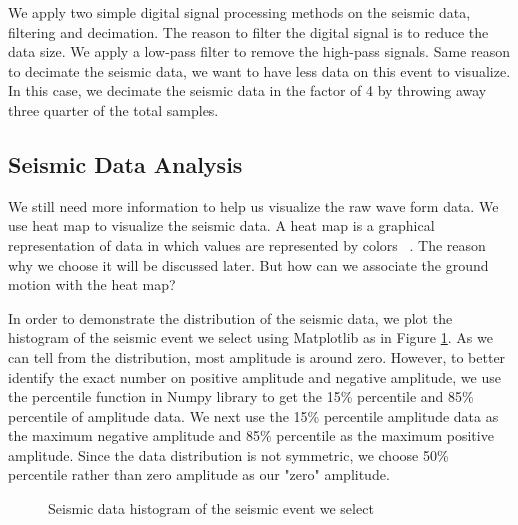 \documentclass[9pt,twocolumn,twoside]{../../styles/osajnl}
\begin{document}
We apply two simple digital signal processing methods on the seismic data, filtering and decimation. The reason to filter the digital signal is to reduce the data size. We apply a low-pass filter to remove the high-pass signals. Same reason to decimate the seismic data, we want to have less data on this event to visualize. In this case, we decimate the seismic data in the factor of 4 by throwing away three quarter of the total samples.

\subsection{Seismic Data Analysis}

We still need more information to help us visualize the raw wave form data. We use heat map to visualize the seismic data. A heat map is a graphical representation of data in which values are represented by colors ~\cite{www-heatmap}. The reason why we choose it will be discussed later. But how can we associate the ground motion with the heat map?

In order to demonstrate the distribution of the seismic data, we plot the histogram of the seismic event we select using Matplotlib as in Figure \ref{fig:percentile}. As we can tell from the distribution, most amplitude is around zero. However, to better identify the exact number on positive amplitude and negative amplitude, we use the percentile function in Numpy library to get the 15\% percentile and 85\% percentile of amplitude data. We next use the 15\% percentile amplitude data as the maximum negative amplitude and 85\% percentile as the maximum positive amplitude. Since the data distribution is not symmetric, we choose 50\% percentile rather than zero amplitude as our "zero" amplitude.

\begin{figure}[htbp]
\centering
{}
\caption{Seismic data histogram of the seismic event we select}
\label{fig:percentile}
\end{figure}
\end{document}
